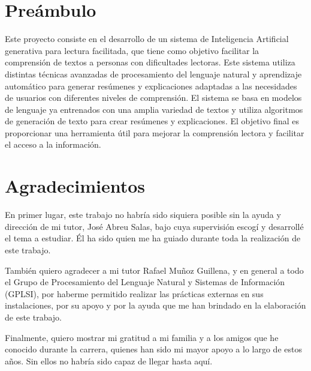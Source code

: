 
\chapter*{Preámbulo}
\thispagestyle{empty}
\vspace{1cm}
Este proyecto consiste en el desarrollo de un sistema de Inteligencia Artificial generativa para lectura facilitada, que tiene como objetivo facilitar 
la comprensión de textos a personas con dificultades lectoras. Este sistema utiliza distintas técnicas avanzadas de procesamiento del lenguaje natural y aprendizaje 
automático para generar resúmenes y explicaciones adaptadas a las necesidades de usuarios con diferentes niveles de comprensión. El sistema se basa en modelos de lenguaje 
ya entrenados con una amplia variedad de textos y utiliza algoritmos de generación de texto para crear resúmenes y explicaciones. El objetivo final es proporcionar 
una herramienta útil para mejorar la comprensión lectora y facilitar el acceso a la información.


\cleardoublepage %
\chapter*{Agradecimientos}

\thispagestyle{empty}
\vspace{1cm}

En primer lugar, este trabajo no habría sido siquiera posible sin la ayuda y dirección de mi tutor, José Abreu Salas, bajo cuya supervisión escogí y desarrollé el tema a estudiar. Él ha sido quien me ha guiado durante toda la realización de este trabajo.
\\
\par También quiero agradecer a mi tutor Rafael Muñoz Guillena, y en general a todo el Grupo de Procesamiento del Lenguaje Natural y Sistemas de Información (GPLSI), por haberme permitido realizar las prácticas externas en sus instalaciones, por su apoyo y por la ayuda que me han brindado en la elaboración de este trabajo.
\\
\par Finalmente, quiero mostrar mi gratitud a mi familia y a los amigos que he conocido durante la carrera, quienes han sido mi mayor apoyo a lo largo de estos años. Sin ellos no habría sido capaz de llegar hasta aquí.



